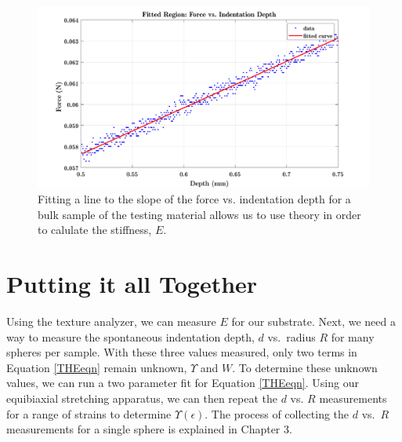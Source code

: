 \begin{figure}
	\centering
	\includegraphics[width=.9\linewidth]{Chapters/Figures/fittedRegionexample}
	\caption[Bulk stiffness Fit]{Fitting a line to the slope of the force vs. indentation depth for a bulk sample of the testing material allows us to use theory in order to calulate the stiffness, $E$.}
	\label{fig:fittedregionexample}
\end{figure}



\section{Putting it all Together}
Using the texture analyzer, we can measure $ E $ for our substrate. Next, we need a way to measure the spontaneous indentation depth, $ d $ vs.~radius $ R $ for many spheres per sample. With these three values measured, only two terms in Equation \ref{THEeqn} remain unknown, $ \Upsilon $ and $ W$. To determine these unknown values, we can run a two parameter fit for Equation \ref{THEeqn}. Using our equibiaxial stretching apparatus, we can then repeat the $ d $ vs. $ R $ measurements for a range of strains to determine $ \Upsilon(\epsilon) $. The process of collecting the $ d $ vs.~$ R $ measurements for a single sphere is explained in Chapter 3.

%